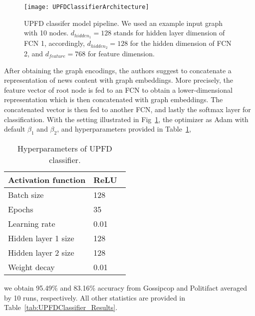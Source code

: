 \begin{figure}
    \centering
    \texttt{[image: UPFDClassifierArchitecture]}
    \caption[UPFD classifier model pipeline]{UPFD classifer model pipeline. We used an example input graph with 10 nodes. $d_{hidden_1} = 128$ stands for hidden layer dimension of FCN 1, accordingly, $d_{hidden_2} = 128$ for the hidden dimension of FCN 2, and $d_{feature} = 768$ for feature dimension.}
    \label{fig:UPFDClassifierArchitecture}
\end{figure}
After obtaining the graph encodings, the authors suggest to concatenate a representation of news content with graph embeddings. More precisely, the feature vector of root node is fed to an FCN to obtain a lower-dimensional representation which is then concatenated with graph embeddings. The concatenated vector is then fed to another FCN, and lastly the softmax layer for classification. With the setting illustrated in Fig~\ref{fig:UPFDClassifierArchitecture}, the optimizer as Adam with default $\beta_1$ and $\beta_2$, and hyperparameters provided in Table~\ref{tab:UPFDClassifier_Hyperparameters},
\begin{table}
    \centering
    \begin{tabular}{|l|l|}
        \hline
        Activation function & ReLU~\parencite{ReLU_Nair} \\
        \hline
        Batch size          & 128                        \\
        \hline
        Epochs              & 35                         \\
        \hline
        Learning rate       & 0.01                       \\
        \hline
        Hidden layer 1 size & 128                        \\
        \hline
        Hidden layer 2 size & 128                        \\
        \hline
        Weight decay        & 0.01                       \\
        \hline
    \end{tabular}
    \caption[Hyperparameters of UPFD classifier.]{Hyperparameters of UPFD classifier.}
    \label{tab:UPFDClassifier_Hyperparameters}
\end{table}
we obtain 95.49\% and 83.16\% accuracy from Gossipcop and Politifact averaged by 10 runs, respectively. All other statistics are provided in Table~\ref{tab:UPFDClassifier_Results}.
